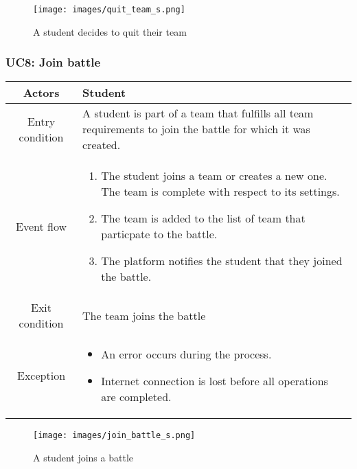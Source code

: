 \documentclass[a4paper, 11pt, titlepage]{article}
\begin{document}
\begin{figure}[h!]
    \centering
    \texttt{[image: images/quit\_team\_s.png]}
    \caption{A student decides to quit their team}
    \label{fig:seq_diag_quit_team}
    
\end{figure}

\clearpage 

\subsubsection*{UC8: Join battle}

\begin{center}
    \begin{tabularx}{\linewidth}{|c|X|}
    \hline
    Actors & Student\\
    \hline
    Entry condition & A student is part of a team that fulfills all team requirements to join the battle for which it was created.\\
    \hline
    Event flow & \begin{enumerate}
        \item The student joins a team or creates a new one. The team is complete with respect to its settings.
        \item The team is added to the list of team that particpate to the battle.
        \item The platform notifies the student that they joined the battle.
    \end{enumerate}\\
    \hline
    Exit condition & The team joins the battle\\
    \hline
    Exception & \begin{itemize}
        \item An error occurs during the process.
        \item Internet connection is lost before all operations are completed.
    \end{itemize}\\    
    \hline
    \end{tabularx}
\end{center}

\begin{figure}[h!]
    \centering
    \texttt{[image: images/join\_battle\_s.png]}
    \caption{A student joins a battle}
    \label{fig:seq_diag_join_battle}
    
\end{figure}
\clearpage
\end{document}
